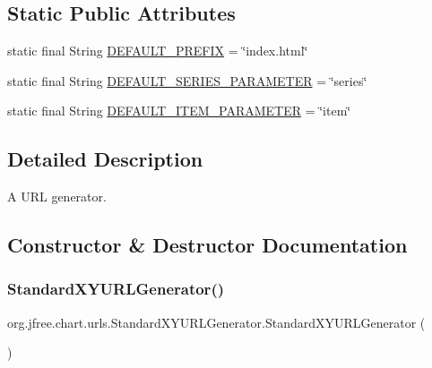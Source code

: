 \subsection*{Static Public Attributes}
\begin{DoxyCompactItemize}
\item 
static final String \mbox{\hyperlink{classorg_1_1jfree_1_1chart_1_1urls_1_1_standard_x_y_u_r_l_generator_a295f02100015d655c7abe0c0fff63f71}{D\+E\+F\+A\+U\+L\+T\+\_\+\+P\+R\+E\+F\+IX}} = \char`\"{}index.\+html\char`\"{}
\item 
static final String \mbox{\hyperlink{classorg_1_1jfree_1_1chart_1_1urls_1_1_standard_x_y_u_r_l_generator_ae3fd79a118c87618ad3a878f946cc870}{D\+E\+F\+A\+U\+L\+T\+\_\+\+S\+E\+R\+I\+E\+S\+\_\+\+P\+A\+R\+A\+M\+E\+T\+ER}} = \char`\"{}series\char`\"{}
\item 
static final String \mbox{\hyperlink{classorg_1_1jfree_1_1chart_1_1urls_1_1_standard_x_y_u_r_l_generator_ab594b86ff829d8954d7196be8431d503}{D\+E\+F\+A\+U\+L\+T\+\_\+\+I\+T\+E\+M\+\_\+\+P\+A\+R\+A\+M\+E\+T\+ER}} = \char`\"{}item\char`\"{}
\end{DoxyCompactItemize}


\subsection{Detailed Description}
A U\+RL generator. 

\subsection{Constructor \& Destructor Documentation}
\mbox{\label{classorg_1_1jfree_1_1chart_1_1urls_1_1_standard_x_y_u_r_l_generator_a425eb3dcb8d8391f50638ed1cb5edd79}} 
\subsubsection{\texorpdfstring{Standard\+X\+Y\+U\+R\+L\+Generator()}{StandardXYURLGenerator()}\hspace{0.1cm}{\footnotesize\ttfamily [1/3]}}
{\footnotesize\ttfamily org.\+jfree.\+chart.\+urls.\+Standard\+X\+Y\+U\+R\+L\+Generator.\+Standard\+X\+Y\+U\+R\+L\+Generator (\begin{DoxyParamCaption}{ }\end{DoxyParamCaption})}

